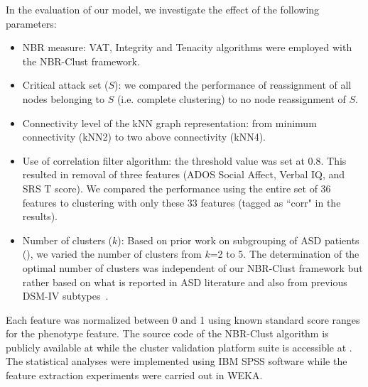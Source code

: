 \documentclass{bmcart}
\begin{document}
In the evaluation of our model, we investigate the effect of the following parameters:
\begin{itemize} 
\item NBR measure: VAT, Integrity and Tenacity algorithms were employed with the NBR-Clust framework.
\item Critical attack set ($S$): we compared the performance of reassignment of all nodes belonging to $S$ (i.e. complete clustering) to no node reassignment of $S$. 
\item Connectivity level of the kNN graph representation: from minimum connectivity (kNN2) to two above connectivity (kNN4).
\item Use of correlation filter algorithm: the threshold value was set at 0.8. This resulted in removal of three features (ADOS Social Affect, Verbal IQ, and SRS T score). We compared the performance using the entire set of 36 features to clustering with only these 33 features (tagged as ``corr" in the results).
\item Number of clusters ($k$): Based on prior work on subgrouping of ASD patients (\cite{ingram2008defining,cuccaro2012exploring,georgiades2013investigating,ousley2014autism,veatch2014genetically,obafemi2015facial,obafemi2015sorting,al2016ensemble,obafemi2018asd}), we varied the number of clusters from $k$=2 to 5. The determination of the optimal number of clusters was independent of our NBR-Clust framework but rather based on what is reported in ASD literature and also from previous DSM-IV subtypes~\cite{lord2012multisite}.
\end{itemize}
Each feature was normalized between 0 and 1 using known standard score ranges for the phenotype feature.
The source code of the NBR-Clust algorithm is publicly available at \cite{NBRProject} while the cluster validation platform suite is accessible at \cite{Nguyen2017}. The statistical analyses were implemented using IBM SPSS software while the feature extraction experiments were carried out in WEKA\cite{frank2016weka}.

\end{document}
